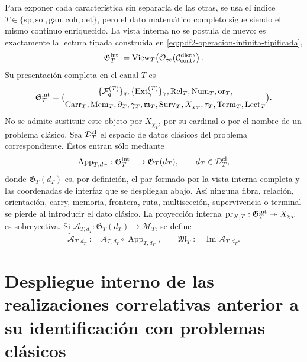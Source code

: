 Para exponer cada característica sin separarla de las otras, se usa el índice
$T\in\{\mathrm{sp},\mathrm{sol},\mathrm{gau},\mathrm{coh},\mathrm{det}\}$,
pero el dato matemático completo sigue siendo el mismo continuo enriquecido. La
vista interna no se postula de nuevo: es exactamente la lectura tipada construida en
\eqref{eq:pdf2-operacion-infinita-tipificada},
\begin{equation}\label{eq:pdf2-g-t-desde-continuo}
 \mathfrak G_T^{\rm int}:=
 \operatorname{View}_T\!\left(
 \mathcal O_\infty(\mathcal C_{\rm cont}^{\rm disc})\right).
\end{equation}
Su presentación completa en el canal \(T\) es
\begin{equation}\label{eq:pdf2-g-t-completo}
 \mathfrak G_T^{\rm int}=
 \bigl(
 \begin{gathered}
 \{\mathcal F_q^{(T)}\}_q,
 \{\operatorname{Ext}_\gamma^{(T)}\}_\gamma,
 \operatorname{Rel}_T,\operatorname{Num}_T,\operatorname{or}_T,\\
 \operatorname{Carr}_T,\operatorname{Mem}_T,\partial_T,\gamma_T,
 \mathfrak m_T,\operatorname{Surv}_T,X_{\chi_T},\tau_T,
 \operatorname{Term}_T,\operatorname{Lect}_T
 \end{gathered}
 \bigr).
\end{equation}
No se admite sustituir este objeto por $X_{\chi_T}$, por su cardinal o por el nombre
de un problema clásico. Sea $\mathcal D_T^{\rm cl}$ el espacio de datos clásicos
del problema correspondiente. Éstos entran sólo mediante
\begin{equation}\label{eq:pdf2-mapa-preparacion-aplicacion}
 \operatorname{App}_{T,d_T}:\mathfrak G_T^{\rm int}\longrightarrow
 \mathfrak G_T(d_T),\qquad d_T\in\mathcal D_T^{\rm cl},
\end{equation}
donde $\mathfrak G_T(d_T)$ es, por definición, el par formado por la vista interna
completa y las coordenadas de interfaz que se despliegan abajo. Así ninguna fibra,
relación, orientación, carry, memoria, frontera, ruta, multisección, supervivencia
o terminal se pierde al introducir el dato clásico. La proyección interna
$\operatorname{pr}_{X,T}:\mathfrak G_T^{\rm int}\twoheadrightarrow X_{\chi_T}$
es sobreyectiva. Si
$\mathcal A_{T,d_T}:\mathfrak G_T(d_T)\to\mathcal M_T$, se define
\[
 \widetilde{\mathcal A}_{T,d_T}:=
 \mathcal A_{T,d_T}\circ\operatorname{App}_{T,d_T},
 \qquad
 \mathfrak M_T:=\operatorname{Im}\mathcal A_{T,d_T}.
\]

\section{Despliegue interno de las realizaciones correlativas anterior a su identificación con problemas clásicos}

